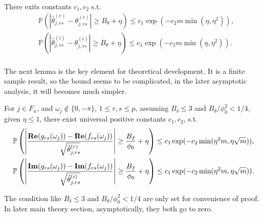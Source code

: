 \begin{lem}
\label{lemma: deviation_variance}
There exits constants $c_1, c_2$ s.t.
\begin{equation}
\begin{aligned}
& \mathbb{P}\left(\left|\hat{\theta}^{(r)}_{j, rs} - \theta^{(r)}_{j, rs}\right|\ge  
B_\theta + \eta \right) \le  c_1\exp(-c_2m\min\left(\eta, \eta^2\right)), \\ 
& \mathbb{P}\left(\left|\hat{\theta}^{(i)}_{j, rs} - \theta^{(i)}_{j, rs}\right|\ge  
B_\theta + \eta \right) \le  c_1\exp(-c_2m\min\left(\eta, \eta^2\right)).\\ 
\end{aligned}
\end{equation}
\end{lem}
The next lemma is the key element for theoretical development. It is a finite sample result, so the bound seems to be complicated, in the later asymptotic analysis, it will becomes much simpler. 
\begin{lem}
For $j\in F_n$, and $\omega_j \notin \{0, -\pi\}$,  $1\le r, s\le p$, 
assuming $B_\delta\le 3$ and $B_\theta/\phi_0^2<1/4$, given $\eta\le 1$, there exist universal positive constants $c_1, c_2$, s.t. 
\begin{equation}
\begin{aligned}
& \mathbb{P}\left(\left|\frac{{\bf Re}(g_{rs}(\omega_j)) - {\bf Re}(f_{rs}(\omega_j))}{\sqrt{\hat{\theta}^{(r)}_{j,rs}}}\right| \ge \frac{B_f}{\phi_0}+\eta\right)\le c_1\exp(-c_2\min(\eta^2 m, \eta \sqrt{m})),\\
& \mathbb{P}\left(\left|\frac{{\bf Im}(g_{rs}(\omega_j)) - {\bf Im}(f_{rs}(\omega_j))}{\sqrt{\hat{\theta}^{(i)}_{j,rs}}}\right| \ge \frac{B_f}{\phi_0}+\eta\right)\le c_1\exp(-c_2\min(\eta^2 m, \eta \sqrt{m})).
\end{aligned}
\end{equation}
\end{lem}
\begin{remark}
The condition like $B_\delta\le 3$ and $B_\theta/\phi_0^2<1/4$ are only set for convenience of proof. In later main theory section, asymptotically, they both go to zero. 
\end{remark}

